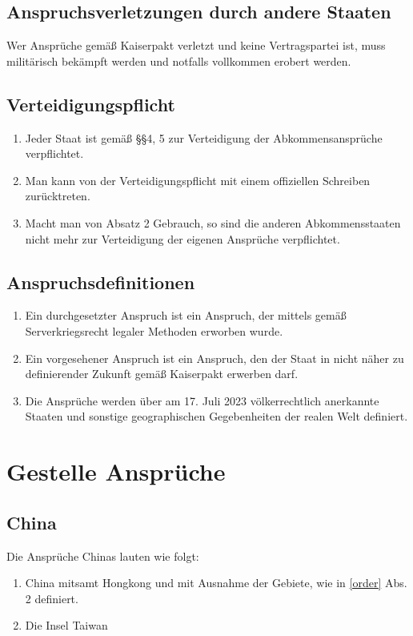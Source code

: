 \documentclass{article}
\begin{document}
\subsection{Anspruchsverletzungen durch andere Staaten}
Wer Ansprüche gemäß Kaiserpakt verletzt und keine Vertragspartei ist, muss militärisch bekämpft werden und notfalls vollkommen erobert werden.

\subsection{Verteidigungspflicht}
\begin{enumerate}[(1)]
    \item Jeder Staat ist gemäß §§4, 5 zur Verteidigung der Abkommensansprüche verpflichtet.
    \item Man kann von der Verteidigungspflicht mit einem offiziellen Schreiben zurücktreten.
    \item Macht man von Absatz 2 Gebrauch, so sind die anderen Abkommensstaaten nicht mehr zur Verteidigung der eigenen Ansprüche verpflichtet.
\end{enumerate}

\subsection{Anspruchsdefinitionen}
\begin{enumerate}[(1)]
    \item Ein durchgesetzter Anspruch ist ein Anspruch, der mittels gemäß Serverkriegsrecht legaler Methoden erworben wurde.
    \item Ein vorgesehener Anspruch ist ein Anspruch, den der Staat in nicht näher zu definierender Zukunft gemäß Kaiserpakt erwerben darf. 
    \item Die Ansprüche werden über am 17. Juli 2023 völkerrechtlich anerkannte Staaten und sonstige geographischen Gegebenheiten der realen Welt definiert.
\end{enumerate}

\section{Gestelle Ansprüche}

\subsection{China}
Die Ansprüche Chinas lauten wie folgt:
\begin{enumerate}
    \item China mitsamt Hongkong und mit Ausnahme der Gebiete, wie in \ref{order} Abs. 2 definiert.
    \item Die Insel Taiwan
\end{enumerate}
\end{document}
